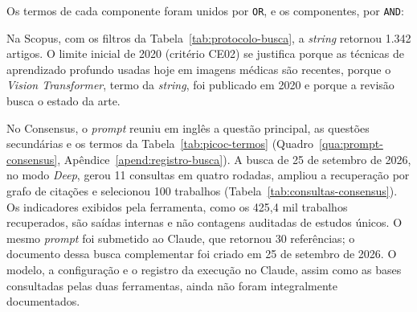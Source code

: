 Os termos de cada componente foram unidos por \texttt{OR}, e os
componentes, por \texttt{AND}:

\begin{center}
\end{center}

Na Scopus, com os filtros da Tabela~\ref{tab:protocolo-busca}, a
\textit{string} retornou 1.342 artigos. O limite inicial de 2020
(critério CE02) se justifica porque as técnicas de aprendizado profundo
usadas hoje em imagens médicas são recentes, porque o \textit{Vision
	Transformer}, termo da \textit{string}, foi publicado em 2020
\cite{dosovitskiy2020} e porque a revisão busca o estado da arte.

No Consensus, o \textit{prompt} reuniu em inglês a questão principal, as
questões secundárias e os termos da Tabela~\ref{tab:picoc-termos}
(Quadro~\ref{qua:prompt-consensus}, Apêndice~\ref{apend:registro-busca}).
A busca de 25 de setembro de 2026, no modo \textit{Deep}, gerou 11
consultas em quatro rodadas, ampliou a recuperação por grafo de citações e
selecionou 100 trabalhos (Tabela~\ref{tab:consultas-consensus}). Os
indicadores exibidos pela ferramenta, como os 425,4 mil trabalhos
recuperados, são saídas internas e não contagens auditadas de estudos
únicos. O mesmo \textit{prompt} foi submetido ao Claude, que retornou 30
referências; o documento dessa busca complementar foi criado em 25 de
setembro de 2026. O modelo, a configuração e o registro da execução no Claude,
assim como as bases consultadas pelas duas ferramentas, ainda não foram
integralmente documentados.

